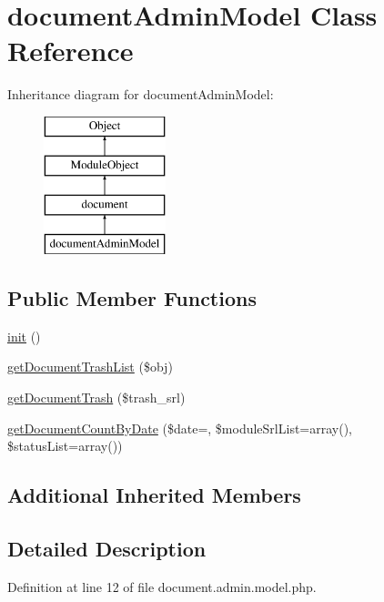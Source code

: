 \hypertarget{classdocumentAdminModel}{}\section{document\+Admin\+Model Class Reference}
\label{classdocumentAdminModel}
Inheritance diagram for document\+Admin\+Model\+:\begin{figure}[H]
\begin{center}
\leavevmode
\includegraphics[height=4.000000cm]{classdocumentAdminModel}
\end{center}
\end{figure}
\subsection*{Public Member Functions}
\begin{DoxyCompactItemize}
\item 
\hyperlink{classdocumentAdminModel_aa2d2c19a8a236499b03c085bbf578c11}{init} ()
\item 
\hyperlink{classdocumentAdminModel_a2dde1d3304ebc18a52a841aee71b4fad}{get\+Document\+Trash\+List} (\$obj)
\item 
\hyperlink{classdocumentAdminModel_a4cff1ba3f56281a915059ecdbcdfd740}{get\+Document\+Trash} (\$trash\+\_\+srl)
\item 
\hyperlink{classdocumentAdminModel_ae364bafc7e994a5b77b75391c83ca629}{get\+Document\+Count\+By\+Date} (\$date=\textquotesingle{}\textquotesingle{}, \$module\+Srl\+List=array(), \$status\+List=array())
\end{DoxyCompactItemize}
\subsection*{Additional Inherited Members}


\subsection{Detailed Description}


Definition at line 12 of file document.\+admin.\+model.\+php.



